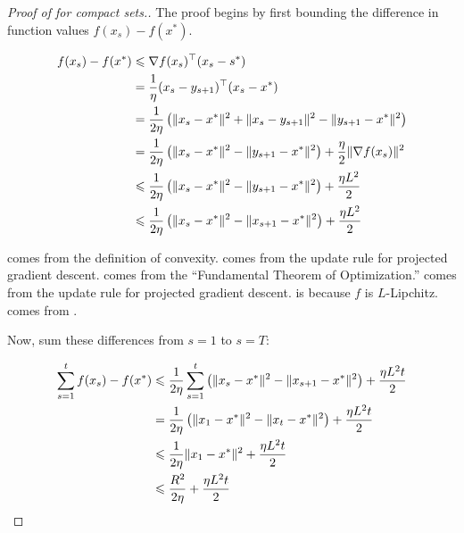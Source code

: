 \begin{proof}[Proof of  for compact sets.]

The proof begins by first bounding the difference in function values $f(x_s) -
f(x^*)$.

\begin{align}
    f(x_s) - f(x^*) &\leq \nabla f(x_s)^\trans (x_s - s^*) \equationlabel{a} \\
    &= \frac{1}{\eta}(x_s - y_{s+1})^\trans(x_s - x^*) \equationlabel{b} \\
    &= \frac{1}{2\eta} \left(\lVert x_s - x^* \rVert^2 + \lVert x_s - y_{s+1} \rVert^2 - \lVert y_{s+1} - x^* \rVert^2 \right) \equationlabel{c} \\
    &= \frac{1}{2\eta} \left(\lVert x_s - x^* \rVert^2 - \lVert y_{s+1} - x^* \rVert^2 \right) + \frac{\eta}{2} \lVert \nabla f(x_s) \rVert^2 \equationlabel{d} \\
    &\leq \frac{1}{2\eta} \left(\lVert x_s - x^* \rVert^2 - \lVert y_{s+1} - x^* \rVert^2 \right) + \frac{\eta L^2}{2} \equationlabel{e} \\
    &\leq \frac{1}{2\eta} \left(\lVert x_s - x^* \rVert^2 - \lVert x_{s+1} - x^* \rVert^2 \right) + \frac{\eta L^2}{2} \equationlabel{f}
\end{align}

 comes from the definition of convexity.  comes
from the update rule for projected gradient descent.  comes from
the ``Fundamental Theorem of Optimization.''  comes from the
update rule for projected gradient descent.  is because $f$ is
$L$-Lipchitz. 
comes from .

Now, sum these differences from $s=1$ to $s=T$:

\begin{align}
   \sum_{s=1}^t f(x_s) - f(x^*) &\leq  \frac{1}{2\eta} \sum_{s=1}^t \left(\lVert x_s - x^* \rVert^2 - \lVert x_{s+1} - x^* \rVert^2 \right) + \frac{\eta L^2 t}{2} \equationlabel{g} \\
   &= \frac{1}{2\eta} \left(\lVert x_1 - x^* \rVert^2 - \lVert x_{t} - x^{*} \rVert^2 \right) + \frac{\eta L^2 t}{2} \equationlabel{h} \\
   &\leq \frac{1}{2\eta} \lVert x_1 - x^* \rVert^2 + \frac{\eta L^2 t}{2} \equationlabel{i} \\
   &\leq \frac{R^2}{2\eta} + \frac{\eta L^2 t}{2} \equationlabel{j}
\end{align}


\end{proof}
